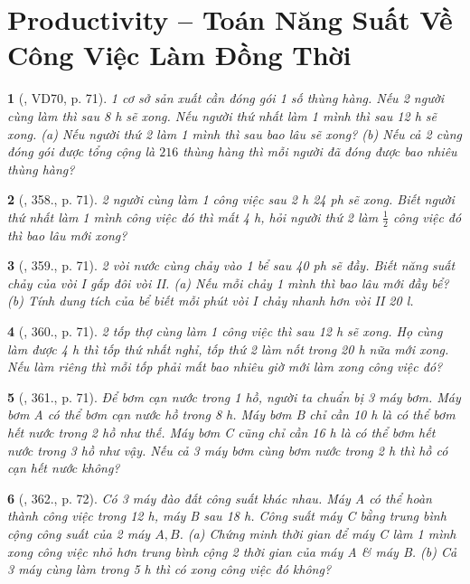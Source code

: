 \documentclass{article}
\newtheorem{baitoan}{}
\begin{document}
\section{Productivity -- Toán Năng Suất Về Công Việc Làm Đồng Thời}

\begin{baitoan}[\cite{Tuyen_Toan_6}, VD70, p. 71]
	1 cơ sở sản xuất cần đóng gói 1 số thùng hàng. Nếu 2 người cùng làm thì sau {\rm8 h} sẽ xong. Nếu người thứ nhất làm 1 mình thì sau {\rm12 h} sẽ xong. (a) Nếu người thứ 2 làm 1 mình thì sau bao lâu sẽ xong? (b) Nếu cả 2 cùng đóng gói được tổng cộng là $216$ thùng hàng thì mỗi người đã đóng được bao nhiêu thùng hàng?
\end{baitoan}

\begin{baitoan}[\cite{Tuyen_Toan_6}, 358., p. 71]
	2 người cùng làm 1 công việc sau {\rm2 h 24 ph} sẽ xong. Biết người thứ nhất làm 1 mình công việc đó thì mất {\rm4 h}, hỏi người thứ 2 làm $\frac{1}{2}$ công việc đó thì bao lâu mới xong?
\end{baitoan}

\begin{baitoan}[\cite{Tuyen_Toan_6}, 359., p. 71]
	2 vòi nước cùng chảy vào 1 bể sau {\rm40 ph} sẽ đầy. Biết năng suất chảy của vòi I gấp đôi vòi II. (a) Nếu mỗi chảy 1 mình thì bao lâu mới đầy bể? (b) Tính dung tích của bể biết mỗi phút vòi I chảy nhanh hơn vòi II {\rm20 l}.
\end{baitoan}

\begin{baitoan}[\cite{Tuyen_Toan_6}, 360., p. 71]
	2 tốp thợ cùng làm 1 công việc thì sau {\rm12 h} sẽ xong. Họ cùng làm được {\rm4 h} thì tốp thứ nhất nghỉ, tốp thứ 2 làm nốt trong {\rm20 h} nữa mới xong. Nếu làm riêng thì mỗi tốp phải mất bao nhiêu giờ mới làm xong công việc đó?
\end{baitoan}

\begin{baitoan}[\cite{Tuyen_Toan_6}, 361., p. 71]
	Để bơm cạn nước trong 1 hồ, người ta chuẩn bị 3 máy bơm. Máy bơm A có thể bơm cạn nước hồ trong {\rm8 h}. Máy bơm B chỉ cần {\rm10 h} là có thể bơm hết nước trong 2 hồ như thế. Máy bơm C cũng chỉ cần {\rm16 h} là có thể bơm hết nước trong 3 hồ như vậy. Nếu cả 3 máy bơm cùng bơm nước trong {\rm2 h} thì hồ có cạn hết nước không?
\end{baitoan}

\begin{baitoan}[\cite{Tuyen_Toan_6}, 362., p. 72]
	Có 3 máy đào đất công suất khác nhau. Máy A có thể hoàn thành công việc trong {\rm12 h}, máy B sau {\rm18 h}. Công suất máy C bằng trung bình cộng công suất của 2 máy $A,B$. (a) Chứng minh thời gian để máy C làm 1 mình xong công việc nhỏ hơn trung bình cộng 2 thời gian của máy A \& máy B. (b) Cả 3 máy cùng làm trong {\rm5 h} thì có xong công việc đó không?
\end{baitoan}
\end{document}
